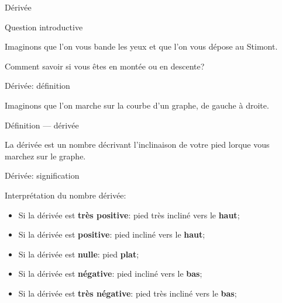 \documentclass{beamer}
\begin{document}
\begin{frame}
    {Dérivée}

    \begin{exampleblock}
        {Question introductive}

        Imaginons que l'on vous bande les yeux et que l'on vous dépose au Stimont.

        \pause{}
        Comment savoir si vous êtes en montée ou en descente?
    \end{exampleblock}
\end{frame}

\begin{frame}
    {Dérivée: définition}

    Imaginons que l'on marche sur la courbe d'un graphe, de gauche à droite.

    \begin{exampleblock}
        {Définition --- dérivée}

        La dérivée est un nombre décrivant l'inclinaison de votre pied lorque vous marchez sur le graphe.
    \end{exampleblock}

    \begin{plot}{0.25}{-10}{-2}{10}{10}
    \end{plot}
\end{frame}

\begin{frame}
    {Dérivée: signification}

    Interprétation du nombre dérivée:
    \begin{itemize}
        \item Si la dérivée est \textbf{très positive}: pied très incliné vers le \textbf{haut};
            \pause{}
        \item Si la dérivée est \textbf{positive}: pied incliné vers le \textbf{haut};
            \pause{}
        \item Si la dérivée est \textbf{nulle}: pied \textbf{plat};
            \pause{}
        \item Si la dérivée est \textbf{négative}: pied incliné vers le \textbf{bas};
            \pause{}
        \item Si la dérivée est \textbf{très négative}: pied très incliné vers le \textbf{bas};
            \pause{}
    \end{itemize}
\end{frame}
\end{document}
